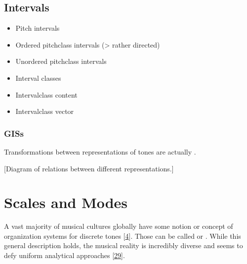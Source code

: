 \documentclass[letterpaper,10pt,english]{sphinxmanual}
\begin{document}
\section{Intervals}
\label{\detokenize{1_fundamentals:intervals}}\label{\detokenize{1_fundamentals:id6}}\begin{itemize}
\item {} 
\sphinxAtStartPar
Pitch intervals

\item {} 
\sphinxAtStartPar
Ordered pitch\sphinxhyphen{}class intervals (\sphinxhyphen{}\textgreater{} rather directed)

\item {} 
\sphinxAtStartPar
Unordered pitch\sphinxhyphen{}class intervals

\item {} 
\sphinxAtStartPar
Interval classes

\item {} 
\sphinxAtStartPar
Interval\sphinxhyphen{}class content

\item {} 
\sphinxAtStartPar
Interval\sphinxhyphen{}class vector

\end{itemize}


\subsection{GISs}
\label{\detokenize{1_fundamentals:giss}}\label{\detokenize{1_fundamentals:sec-gis}}
\sphinxAtStartPar
Transformations between representations of tones are actually .

\sphinxAtStartPar
{[}Diagram of relations between different representations.{]}


\chapter{Scales and Modes}
\label{\detokenize{2_scales_modes:scales-and-modes}}\label{\detokenize{2_scales_modes::doc}}
\sphinxAtStartPar
A vast majority of musical cultures globally have some notion or concept of organization systems
for discrete tones {[}\hyperlink{cite.8_bibliography:id39}{4}{]}. Those can be called  or .
While this general description holds, the musical reality is incredibly diverse and seems to defy
uniform analytical approaches {[}\hyperlink{cite.8_bibliography:id40}{29}{]}.
\end{document}
